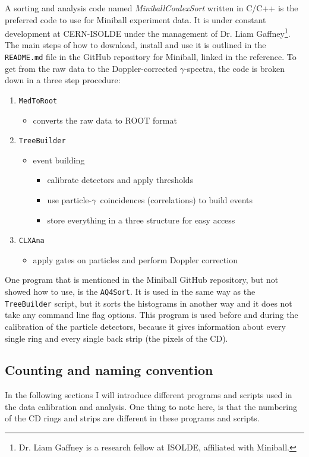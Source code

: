 \documentclass[twoside,english]{uiofysmaster/uiofysmaster}
\newcommand{\ga}{$\gamma$}
\begin{document}
A sorting and analysis code named \textsl{MiniballCoulexSort} \cite{MBCS} written in C/C++ is the preferred code to use for Miniball experiment data. 
It is under constant development at CERN-ISOLDE under the management of Dr. Liam Gaffney\footnote{Dr. Liam Gaffney is a research fellow at ISOLDE, affiliated with Miniball.}. The main steps of how to download, install and use it is outlined in the \texttt{README.md} file in the GitHub repository for Miniball, linked in the reference. To get from the raw data to the Doppler-corrected \ga-spectra, the code is broken down in a three step procedure:

\begin{enumerate}
	\item \texttt{MedToRoot}
	\begin{itemize}
		\item converts the raw data to ROOT format
	\end{itemize}
	\item \texttt{TreeBuilder}
	\begin{itemize}
		\item event building
		\begin{itemize}
			\item calibrate detectors and apply thresholds
			\item use particle-\ga\ coincidences (correlations) to build events
			\item store everything in a three structure for easy access
		\end{itemize}
	\end{itemize}
	\item \texttt{CLXAna}
	\begin{itemize}
		\item apply gates on particles and perform Doppler correction
	\end{itemize}
\end{enumerate}

One program that is mentioned in the Miniball GitHub repository, but not showed how to use, is the \texttt{AQ4Sort}. It is used in the same way as the \texttt{TreeBuilder} script, but it sorts the histograms in another way and it does not take any command line flag options. 
This program is used before and during the calibration of the particle detectors, because it gives information about every single ring and every single back strip (the pixels of the CD). 


\subsection{Counting and naming convention}
In the following sections I will introduce different programs and scripts used in the data calibration and analysis. One thing to note here, is that the numbering of the CD rings and strips are different in these programs and scripts. 
\end{document}
